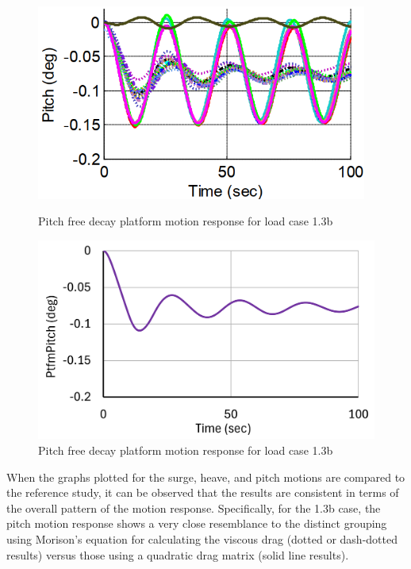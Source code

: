\documentclass[a4paper, 11pt]{article}
\begin{document}
\begin{figure}[H]
    \begin{minipage}{0.47\textwidth}
        \centering
        \includegraphics[width=0.97\textwidth]{1.3b_pitch.png}
        \caption{\small Pitch free decay platform motion response for load case 1.3b \cite{Robertson2014}}
        \label{fig:1.3b_pitch}
    \end{minipage}
    \hfill
    \begin{minipage}{0.5\textwidth}
        \centering
        \vspace{-0.3cm}
        \includegraphics[width=1\textwidth]{1.3b_pitch_mine.png}
        \caption{\small Pitch free decay platform motion response for load case 1.3b}
        \label{fig:1.3b_pitch_mine}
    \end{minipage}
\end{figure}

When the graphs plotted for the surge, heave, and pitch motions are compared to the reference study, it can be observed that the results are consistent in terms of the overall pattern of the motion response. Specifically, for the 1.3b case, the pitch motion response shows a very close resemblance to the distinct grouping using Morison’s equation for calculating the viscous drag (dotted or dash-dotted results) versus those using a quadratic drag matrix (solid line results).
\end{document}
